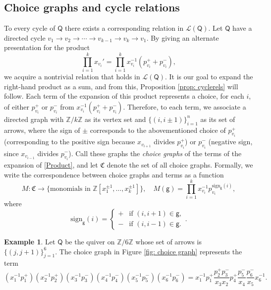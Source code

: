 \documentclass[10pt]{amsart}
\numberwithin{equation}{section}
\theoremstyle{definition}
\newtheorem{ex}[thm]{Example}
\theoremstyle{remark}
\newcommand{\Z}{\mathbb{Z}}
\renewcommand{\L}{\mathcal{L}}%
\newcommand{\1}{^{-1}}
\def\Q{\mathsf{Q}}
\begin{document}
\subsection{Choice graphs and cycle relations}
\noindent
To every cycle of $\Q$ there exists a corresponding relation in $\L(\Q)$. Let $\Q$ have a directed cycle $v_1 \to v_2 \to \cdots \to v_{k-1} \to v_k \to v_1$. By giving an alternate presentation for the product
\begin{equation}\label{Product}
\prod_{i=1}^k x_{v_i}' = \prod_{i=1}^k x_{v_i}\1 (p_{v_i}^+ + p_{v_i}^-),
\end{equation}
we acquire a nontrivial relation that holds in $\L(\Q)$. It is our goal to expand the right-hand product as a sum, and from this, Proposition \ref{prop: cyclerels} will follow.
Each term of the expansion of this product represents a choice, for each $i$, of either $p_{v_i}^+$ or $p_{v_i}^-$ from $x_{v_i}\1(p_{v_i}^+ + p_{v_i}^-)$. Therefore, to each term, we associate a directed graph with $\Z/k\Z$ as its vertex set and $\{(i,i\pm1)\}_{i=1}^n$ as its set of arrows, where the sign of $\pm$ corresponds to the abovementioned choice of $p_{v_i}^+$ (corresponding to the positive sign because $x_{v_{i+1}}$ divides $p_{v_i}^+$) or $p_{v_i}^-$ (negative sign, since $x_{v_{i-1}}$ divides $p_{v_i}^-$). Call these graphs the \textit{choice graphs} of the terms of the expansion of \eqref{Product}, and let $\mathfrak C$ denote the set of all choice graphs. Formally, we write the correspondence between choice graphs and terms as a function
\begin{equation}
M: \mathfrak C \to \{\text{monomials in }\Z[x_1^{\pm1},\dots,x_k^{\pm1}]\},\quad M(\mathsf g) = \prod_{i=1}^k x_{v_i}\1p_{v_i}^{\mathrm{sign}_{\mathsf g}(i)},
\end{equation}
where
\begin{equation}
\mathrm{sign}_{\mathsf g}(i) = \begin{cases} + & \text{if } (i,i+1) \in \mathsf g,\\ - & \text{if } (i,i-1) \in \mathsf g. \end{cases}.
\end{equation}
\begin{ex}
Let $\Q$ be the quiver on $\Z/6\Z$ whose set of arrows is $\{(j,j+1)\}_{j=1}^6$. The choice graph in Figure \ref{fig: choice graph} represents the term
\[
(x_{1}\1 p_{1}^+)(x_{2}\1 p_{2}^+)(x_{3}\1 p_{3}^-)(x_{4}\1 p_{4}^-)(x_{5}\1 p_{5}^-)(x_{6}\1 p_{6}^-) = x_{1}\1 p_{1}^+ \frac{p_{2}^+ p_{3}^-}{x_3 x_2} p_4^+ \frac{p_5^-}{x_4} \frac{p_6^-}{x_5} x_{6}\1.
\]
\end{ex}
\end{document}
